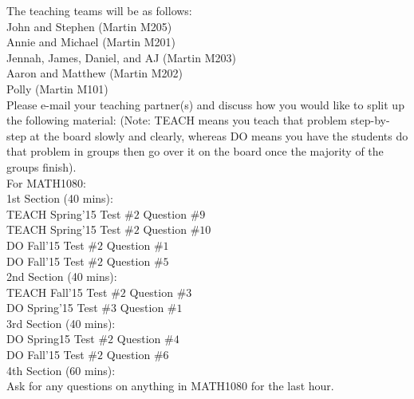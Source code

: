 \documentclass[paper=a4, fontsize=11pt]{scrartcl} %
\numberwithin{equation}{section} %
\numberwithin{figure}{section} %
\numberwithin{table}{section} %
\begin{document}
The teaching teams will be as follows: \\
John and Stephen (Martin M205) \\
Annie and Michael (Martin M201) \\
Jennah, James, Daniel, and AJ (Martin M203) \\
Aaron and Matthew (Martin M202) \\
Polly (Martin M101) \\

Please e-mail your teaching partner(s) and discuss how you would like to split up the following material: (Note: TEACH means you teach that problem step-by-step at the board slowly and clearly, whereas DO means you have the students do that problem in groups then go over it on the board once the majority of the groups finish). \\

For MATH1080: \\

1st Section (40 mins): \\
TEACH Spring'15 Test $\#  2$ Question $\# 9$ \\
TEACH Spring'15 Test $\# 2$ Question $\# 10$ \\
DO Fall'15 Test $\# 2$ Question $\# 1$ \\
DO Fall'15 Test $\# 2$ Question $\# 5$ \\

2nd Section (40 mins): \\
TEACH Fall'15 Test $\# 2$ Question $\# 3$ \\
DO Spring'15 Test $\# 3$ Question $\# 1$ \\

3rd Section (40 mins): \\
DO Spring15 Test $\# 2$ Question $\# 4$ \\
DO Fall'15 Test $\# 2$ Question $\# 6$ \\

4th Section (60 mins): \\
Ask for any questions on anything in MATH1080 for the last hour. \\

\end{document}
